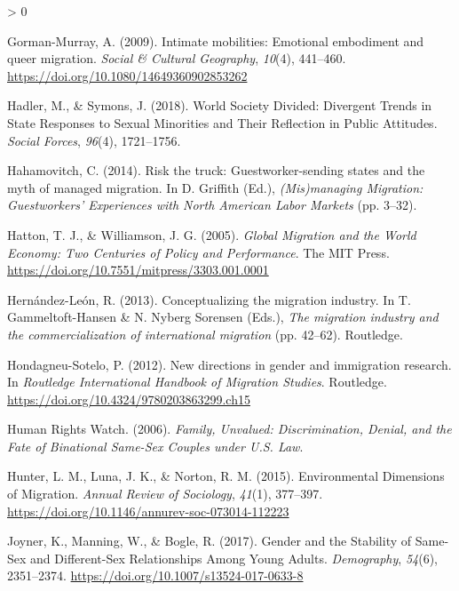 \documentclass[
  12pt,
]{article}
\newlength{\cslhangindent}
\newenvironment{CSLReferences}[2] %
 {%
  \setlength{\parindent}{0pt}
  \ifodd #1 \everypar{\setlength{\hangindent}{\cslhangindent}}\ignorespaces\fi
  \ifnum #2 > 0
  \setlength{\parskip}{#2\baselineskip}
  \fi
 }%
 {}
\begin{document}
\begin{CSLReferences}{1}{0}
\leavevmode\hypertarget{ref-gorman-murray_2009}{}%
Gorman-Murray, A. (2009). Intimate mobilities: Emotional embodiment and queer migration. \emph{Social \& Cultural Geography}, \emph{10}(4), 441--460. \url{https://doi.org/10.1080/14649360902853262}

\leavevmode\hypertarget{ref-hadler_2018_world}{}%
Hadler, M., \& Symons, J. (2018). World {Society Divided}: Divergent {Trends} in {State Responses} to {Sexual Minorities} and {Their Reflection} in {Public Attitudes}. \emph{Social Forces}, \emph{96}(4), 1721--1756.

\leavevmode\hypertarget{ref-hahamovitch_2014}{}%
Hahamovitch, C. (2014). Risk the truck: Guestworker-sending states and the myth of managed migration. In D. Griffith (Ed.), \emph{({Mis})managing {Migration}: Guestworkers' {Experiences} with {North American Labor Markets}} (pp. 3--32).

\leavevmode\hypertarget{ref-hatton_2005a}{}%
Hatton, T. J., \& Williamson, J. G. (2005). \emph{Global {Migration} and the {World Economy}: Two {Centuries} of {Policy} and {Performance}}. {The MIT Press}. \url{https://doi.org/10.7551/mitpress/3303.001.0001}

\leavevmode\hypertarget{ref-hernandez-leon_2013}{}%
Hernández-León, R. (2013). Conceptualizing the migration industry. In T. Gammeltoft-Hansen \& N. Nyberg Sorensen (Eds.), \emph{The migration industry and the commercialization of international migration} (pp. 42--62). {Routledge}.

\leavevmode\hypertarget{ref-hondagneu-sotelo_2012}{}%
Hondagneu-Sotelo, P. (2012). New directions in gender and immigration research. In \emph{Routledge {International Handbook} of {Migration Studies}}. {Routledge}. \url{https://doi.org/10.4324/9780203863299.ch15}

\leavevmode\hypertarget{ref-humanrightswatch_2006}{}%
Human Rights Watch. (2006). \emph{Family, {Unvalued}: Discrimination, {Denial}, and the {Fate} of {Binational Same}-{Sex Couples} under {U}.{S}. {Law}}.

\leavevmode\hypertarget{ref-hunter_2015}{}%
Hunter, L. M., Luna, J. K., \& Norton, R. M. (2015). Environmental {Dimensions} of {Migration}. \emph{Annual Review of Sociology}, \emph{41}(1), 377--397. \url{https://doi.org/10.1146/annurev-soc-073014-112223}

\leavevmode\hypertarget{ref-joyner_2017}{}%
Joyner, K., Manning, W., \& Bogle, R. (2017). Gender and the {Stability} of {Same}-{Sex} and {Different}-{Sex Relationships Among Young Adults}. \emph{Demography}, \emph{54}(6), 2351--2374. \url{https://doi.org/10.1007/s13524-017-0633-8}


\end{CSLReferences}
\end{document}
